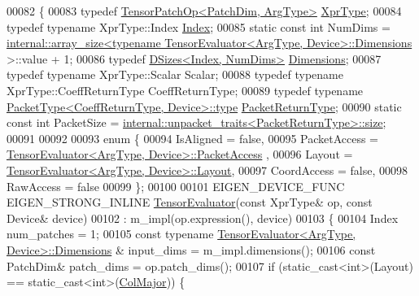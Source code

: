 \begin{DoxyCode}
00082 \{
00083   \textcolor{keyword}{typedef} \hyperlink{class_eigen_1_1_tensor_patch_op}{TensorPatchOp<PatchDim, ArgType>} 
      \hyperlink{class_eigen_1_1_tensor_patch_op}{XprType};
00084   \textcolor{keyword}{typedef} \textcolor{keyword}{typename} XprType::Index \hyperlink{namespace_eigen_a62e77e0933482dafde8fe197d9a2cfde}{Index};
00085   \textcolor{keyword}{static} \textcolor{keyword}{const} \textcolor{keywordtype}{int} NumDims = 
      \hyperlink{struct_eigen_1_1internal_1_1array__size}{internal::array\_size<typename TensorEvaluator<ArgType, Device>::Dimensions}
      >::value + 1;
00086   \textcolor{keyword}{typedef} \hyperlink{struct_eigen_1_1_d_sizes}{DSizes<Index, NumDims>} \hyperlink{struct_eigen_1_1_d_sizes}{Dimensions};
00087   \textcolor{keyword}{typedef} \textcolor{keyword}{typename} XprType::Scalar Scalar;
00088   \textcolor{keyword}{typedef} \textcolor{keyword}{typename} XprType::CoeffReturnType CoeffReturnType;
00089   \textcolor{keyword}{typedef} \textcolor{keyword}{typename} \hyperlink{group___sparse_core___module}{PacketType<CoeffReturnType, Device>::type} 
      \hyperlink{group___sparse_core___module}{PacketReturnType};
00090   \textcolor{keyword}{static} \textcolor{keyword}{const} \textcolor{keywordtype}{int} PacketSize = 
      \hyperlink{struct_eigen_1_1internal_1_1unpacket__traits}{internal::unpacket\_traits<PacketReturnType>::size};
00091 
00092 
00093   \textcolor{keyword}{enum} \{
00094     IsAligned = \textcolor{keyword}{false},
00095     PacketAccess = \hyperlink{struct_eigen_1_1_tensor_evaluator}{TensorEvaluator<ArgType, Device>::PacketAccess}
      ,
00096     Layout = \hyperlink{struct_eigen_1_1_tensor_evaluator}{TensorEvaluator<ArgType, Device>::Layout},
00097     CoordAccess = \textcolor{keyword}{false},
00098     RawAccess = \textcolor{keyword}{false}
00099  \};
00100 
00101   EIGEN\_DEVICE\_FUNC EIGEN\_STRONG\_INLINE \hyperlink{struct_eigen_1_1_tensor_evaluator}{TensorEvaluator}(\textcolor{keyword}{const} XprType& op, \textcolor{keyword}{const} Device& 
      device)
00102       : m\_impl(op.expression(), device)
00103   \{
00104     Index num\_patches = 1;
00105     \textcolor{keyword}{const} \textcolor{keyword}{typename} \hyperlink{struct_eigen_1_1_tensor_evaluator}{TensorEvaluator<ArgType, Device>::Dimensions}
      & input\_dims = m\_impl.dimensions();
00106     \textcolor{keyword}{const} PatchDim& patch\_dims = op.patch\_dims();
00107     \textcolor{keywordflow}{if} (static\_cast<int>(Layout) == static\_cast<int>(\hyperlink{group__enums_ggaacded1a18ae58b0f554751f6cdf9eb13a0cbd4bdd0abcfc0224c5fcb5e4f6669a}{ColMajor})) \{

\end{DoxyCode}
